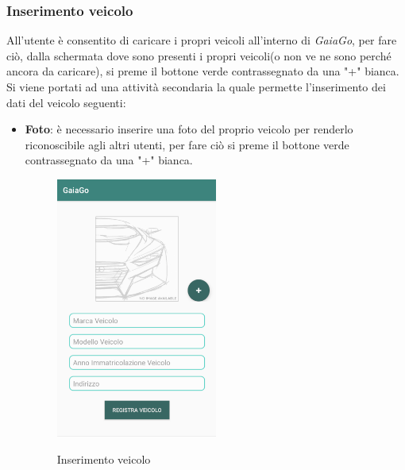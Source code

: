 \subsubsection{Inserimento veicolo}
All'utente è consentito di caricare i propri veicoli all'interno di \textit{GaiaGo}, per fare ciò, dalla schermata dove sono presenti i propri veicoli(o non ve ne sono perché ancora da caricare), si preme il bottone verde contrassegnato da una "+" bianca.
Si viene portati ad una attività secondaria la quale permette l'inserimento dei dati del veicolo seguenti:
\begin{itemize}
	\item \textbf{Foto}: è necessario inserire una foto del proprio veicolo per renderlo riconoscibile agli altri utenti, per fare ciò si preme il bottone verde contrassegnato da una "+" bianca.
	 \begin{figure}[H] 
		\centering 
		\includegraphics[width=0.5\textwidth]{res/images/caricamento_veicolo.png}\\
		\caption{Inserimento veicolo}
		\label{ins}
	\end{figure}
\pagebreak


\end{itemize}
